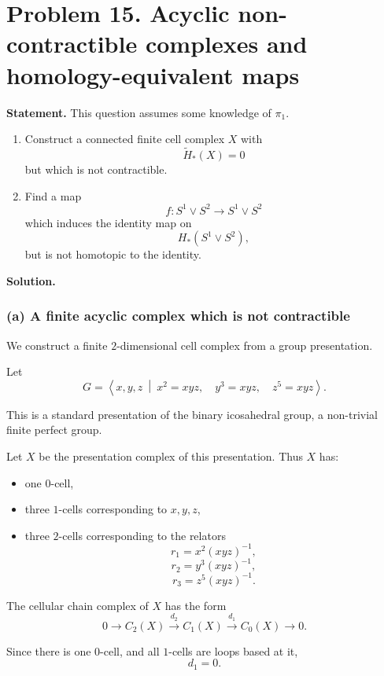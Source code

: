 \documentclass[12pt,a4paper]{article}
\theoremstyle{notespace}
\begin{document}
\section{Problem 15. Acyclic non-contractible complexes and homology-equivalent maps}

\textbf{Statement.}
This question assumes some knowledge of \(\pi_1\).

\begin{enumerate}
	\item[(a)] Construct a connected finite cell complex \(X\) with
	\[
	\widetilde H_*(X)=0
	\]
	but which is not contractible.
	
	\item[(b)] Find a map
	\[
	f:S^1\vee S^2\to S^1\vee S^2
	\]
	which induces the identity map on
	\[
	H_*(S^1\vee S^2),
	\]
	but is not homotopic to the identity.
\end{enumerate}

\textbf{Solution.}

\subsubsection*{(a) A finite acyclic complex which is not contractible}

We construct a finite \(2\)-dimensional cell complex from a group presentation.

Let
\[
G=
\left\langle
x,y,z
\ \middle|\
x^2=xyz,\quad
y^3=xyz,\quad
z^5=xyz
\right\rangle.
\]

This is a standard presentation of the binary icosahedral group, a non-trivial finite perfect group.

Let \(X\) be the presentation complex of this presentation. Thus \(X\) has:

\begin{itemize}
	\item one \(0\)-cell,
	\item three \(1\)-cells corresponding to \(x,y,z\),
	\item three \(2\)-cells corresponding to the relators
	\[
	r_1=x^2(xyz)^{-1},
	\]
	\[
	r_2=y^3(xyz)^{-1},
	\]
	\[
	r_3=z^5(xyz)^{-1}.
	\]
\end{itemize}

The cellular chain complex of \(X\) has the form
\[
0
\longrightarrow
C_2(X)
\xrightarrow{d_2}
C_1(X)
\xrightarrow{d_1}
C_0(X)
\longrightarrow
0.
\]

Since there is one \(0\)-cell, and all \(1\)-cells are loops based at it,
\[
d_1=0.
\]
\end{document}
